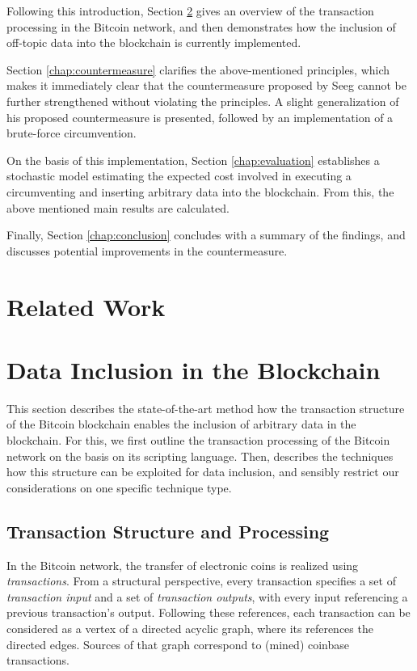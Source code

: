 \documentclass[a4paper,11pt,titlepage]{scrbook}
\begin{document}
Following this introduction, Section \ref{chap:problem} gives an overview of the transaction processing in the Bitcoin network, and then demonstrates how the inclusion of off-topic data into the blockchain is currently implemented.

Section \ref{chap:countermeasure} clarifies the above-mentioned principles, which makes it immediately clear that the countermeasure proposed by Seeg cannot be further strengthened without violating the principles.
A slight generalization of his proposed countermeasure is presented, followed by an implementation of a brute-force circumvention.

On the basis of this implementation, Section \ref{chap:evaluation} establishes a stochastic model estimating the expected cost involved in executing a circumventing and inserting arbitrary data into the blockchain.
From this, the above mentioned main results are calculated.

Finally, Section \ref{chap:conclusion} concludes with a summary of the findings, and discusses potential improvements in the countermeasure.



\chapter{Related Work}\label{chap:relatedwork}


\chapter{Data Inclusion in the Blockchain}\label{chap:problem}

This section describes the state-of-the-art method how the transaction structure of the Bitcoin blockchain enables the inclusion of arbitrary data in the blockchain.
For this, we first outline the transaction processing of the Bitcoin network on the basis on its scripting language. Then, describes the techniques how this structure can be exploited for data inclusion, and sensibly restrict our considerations on one specific technique type.


\section{Transaction Structure and Processing}

In the Bitcoin network, the transfer of electronic coins is realized using \emph{transactions}.
From a structural perspective, every transaction specifies a set of \emph{transaction input} and a set of \emph{transaction outputs}, with every input referencing a previous transaction's output.
Following these references, each transaction can be considered as a vertex of a directed acyclic graph, where  its references the directed edges. Sources of that graph correspond to (mined) coinbase transactions.
\end{document}
